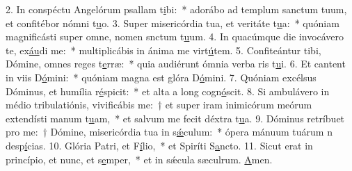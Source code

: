 2. In conspéctu Angelórum psallam t\uline{i}bi:~* adorábo ad templum sanctum tuum, et confitébor nómni t\uline{u}o.
3. Super misericórdia tua, et veritáte t\uline{u}a:~* quóniam magnificásti super omne, nomen snctum t\uline{u}um.
4. In quacúmque die invocávero te, ex\uline{áu}di me:~* multiplicábis in ánima me virt\uline{ú}tem.
5. Confiteántur tibi, Dómine, omnes reges t\uline{e}rræ:~* quia audiérunt ómnia verba ris t\uline{u}i.
6. Et cantent in viis D\uline{ó}mini:~* quóniam magna est glóra D\uline{ó}mini.
7. Quóniam excélsus Dóminus, et humília r\uline{é}spicit:~* et alta a long cogn\uline{ó}scit.
8. Si ambulávero in médio tribulatiónis, vivificábis me:~† et super iram inimicórum meórum extendísti manum t\uline{u}am,~* et salvum me fecit déxtra t\uline{u}a.
9. Dóminus retríbuet pro me:~† Dómine, misericórdia tua in s\uline{ǽ}culum:~* ópera mánuum tuárum n desp\uline{í}cias.
10. Glória Patri, et F\uline{í}lio,~* et Spiríti S\uline{a}ncto.
11. Sicut erat in princípio, et nunc, et s\uline{e}mper,~* et in sǽcula sæculrum. \uline{A}men.

